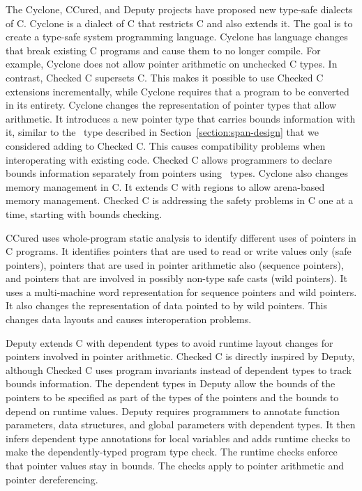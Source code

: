 The Cyclone, CCured, and Deputy projects have proposed new type-safe dialects 
of C.   Cyclone \cite{Jim2002} is a dialect of C that restricts C and also extends it.  The goal is to create a type-safe system programming
language.  Cyclone has language changes that break existing C programs and
cause them to no longer compile.  For example, Cyclone does not allow pointer
arithmetic on unchecked C types.   In contrast, Checked C supersets C. This
makes it possible to use Checked C extensions incrementally, while Cyclone
requires that a program to be converted in its entirety.  Cyclone changes the representation of pointer types that allow arithmetic.  It introduces a new 
pointer type that carries bounds information with it, similar to the \spanptr\
type described in Section~\ref{section:span-design} that we considered adding to Checked C.
This causes  compatibility problems when interoperating with existing
code.   Checked C allows programmers to declare bounds information separately from pointers using \arrayptr\ types.
Cyclone also changes memory management in C.  It extends C with regions
to allow arena-based memory management.  Checked C is addressing the
safety problems in C one at a time, starting with bounds checking. 

CCured \cite{Necula2005} uses whole-program static analysis to identify 
different uses of pointers in C programs. It identifies pointers that are used to
read or write values only (safe pointers), pointers that are used in pointer
arithmetic also (sequence pointers), and pointers that are involved in
possibly non-type safe casts (wild pointers). It uses a multi-machine
word representation for sequence pointers and wild pointers. It also
changes the representation of data pointed to by wild pointers. This
changes data layouts and causes interoperation problems.

Deputy \cite{Condit2007,Feng2006} extends C with dependent types to avoid runtime 
layout changes for pointers involved in pointer arithmetic.  Checked C is directly
inspired by Deputy, although Checked C uses program invariants instead of
dependent types to track bounds information.   The dependent types in Deputy
allow the bounds of
the pointers to be specified as part of the types of the pointers and
the bounds to depend on runtime values. Deputy requires programmers to
annotate function parameters, data structures, and global parameters
with dependent types. It then infers dependent type annotations for
local variables and adds runtime checks to make the dependently-typed
program type check. The runtime checks enforce that pointer values stay
in bounds. The checks apply to pointer arithmetic and pointer
dereferencing.

